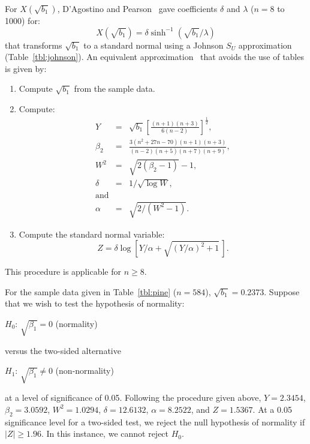 \documentclass[draft]{article}
\newenvironment{example}{%
   \vspace{\baselineskip}
   \par\noindent\hrulefill\par
   \noindent{\em Example:}}{%
   \par\noindent\hrulefill\par
   \vspace{\baselineskip}}
\begin{document}
For \(X\left(\sqrt{b_1}\right)\), D'Agostino and
Pearson~\cite{dagostino73} gave coefficients \(\delta\)
and \(\lambda\) (\(n=8\) to 1000) for:
\begin{equation}
X\left(\sqrt{b_1}\right) = \delta \sinh^{-1}
\left(\sqrt{b_1}/\lambda\right)
\end{equation}
that transforms \(\sqrt{b_1}\) to a standard normal
using a Johnson \(S_U\) approximation (Table~\ref{tbl:johnson}).
\label{sec:johnson-su}
An equivalent approximation~\cite{dagostino86}
that avoids the use of tables is given by:
\begin{enumerate}
\item Compute \(\sqrt{b_1}\) from the sample data.
\item Compute:
\begin{eqnarray}
Y &=& \sqrt{b_1} \left[\frac{\left(n+1\right)\left(n+3\right)}
                         {6\left(n-2\right)}\right]^{\frac{1}{2}}, \\
\beta_2 &=& \frac{3\left(n^2+27n-70\right)\left(n+1\right)\left(n+3\right)}
        {\left(n-2\right)\left(n+5\right)\left(n+7\right)\left(n+9\right)},\\
W^2 &=& \sqrt{2\left(\beta_2-1\right)}-1, \\
\delta &=& 1/\sqrt{\log W}, \\
\mbox{and}\\
\alpha &=& \sqrt{2/\left(W^2-1\right)}.
\end{eqnarray}
\item Compute the standard normal variable:
\begin{equation}
Z = \delta \log\left[Y/\alpha + \sqrt{\left(Y/\alpha\right)^2+1}\,\right].
\end{equation}
\end{enumerate}
This procedure is applicable for \(n\ge8\).


\begin{example}
For the sample data given in Table~\ref{tbl:pine} (\(n=584\)),
\(\sqrt{b_1} = 0.2373\).  Suppose that we wish to test the
hypothesis of normality:

\(H_0\): \(\sqrt{\beta_1}=0\) (normality)

\noindent versus the two-sided alternative

\(H_1\): \(\sqrt{\beta_1}\ne0\) (non-normality)

\noindent at a level of significance of 0.05.
Following the procedure given above,
\(Y =2.3454\),
\(\beta_2 = 3.0592\),
\(W^2 = 1.0294\),
\(\delta=12.6132\),
\(\alpha=8.2522\), and
\(Z=1.5367\).
At a 0.05 significance level for a two-sided test, we reject
the null hypothesis of normality if \(\left|Z\right|\ge1.96\). In
this instance, we cannot reject \(H_0\).
\end{example}
\end{document}
